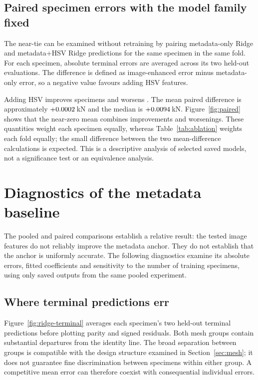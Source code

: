 \subsection{Paired specimen errors with the model family fixed}
The near-tie can be examined without retraining by pairing metadata-only Ridge and metadata+HSV Ridge predictions for the same specimen in the same fold. For each specimen, absolute terminal errors are averaged across its two held-out evaluations. The difference is defined as image-enhanced error minus metadata-only error, so a negative value favours adding HSV features.

Adding HSV improves \pairedImproved{} specimens and worsens \pairedWorsened{}. The mean paired difference is approximately $+0.0002$\,kN and the median is $+0.0094$\,kN. Figure~\ref{fig:paired} shows that the near-zero mean combines improvements and worsenings. These quantities weight each specimen equally, whereas Table~\ref{tab:ablation} weights each fold equally; the small difference between the two mean-difference calculations is expected. This is a descriptive analysis of selected saved models, not a significance test or an equivalence analysis.


\section{Diagnostics of the metadata baseline}\label{sec:ridge-diagnostics}
The pooled and paired comparisons establish a relative result: the tested image features do not reliably improve the metadata anchor. They do not establish that the anchor is uniformly accurate. The following diagnostics examine its absolute errors, fitted coefficients and sensitivity to the number of training specimens, using only saved outputs from the same pooled experiment.

\subsection{Where terminal predictions err}
Figure~\ref{fig:ridge-terminal} averages each specimen's two held-out terminal predictions before plotting parity and signed residuals. Both mesh groups contain substantial departures from the identity line. The broad separation between groups is compatible with the design structure examined in Section~\ref{sec:mesh}; it does not guarantee fine discrimination between specimens within either group. A competitive mean error can therefore coexist with consequential individual errors.

